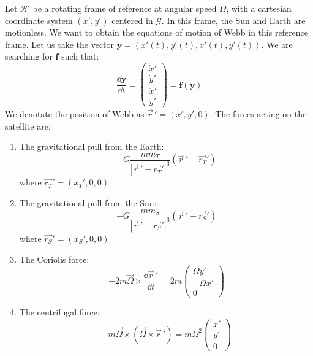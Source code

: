 Let \(\mathcal R'\) be a rotating frame of reference at angular speed \(\Omega\), with a cartesian coordinate system \((x',y')\) centered in \(\mathcal G\). In this frame, the Sun and Earth are motionless. We want to obtain the equations of motion of Webb in this reference frame. Let us take the vector \(\mathbf{y} = (x'(t), y'(t), \dot x'(t), \dot y'(t))\). We are searching for \(\mathbf{f}\) such that:
\begin{equation}
    \frac{\dd \mathbf{y}}{\dd t} = \left(\begin{matrix} \dot x' \\ \dot y' \\ \ddot x' \\ \ddot y' \end{matrix}\right) = \mathbf{f}(\mathbf{y})
\end{equation}
We denotate the position of Webb as \(\vec{r}\,' = (x', y', 0)\). The forces acting on the satellite are:
\begin{enumerate}
    \item The gravitational pull from the Earth:
    \begin{equation}
        -G \frac{m m_T}{|\vec{r}\,' - \vec{r_T}'|^3} (\vec{r}\,' - \vec{r_T}')
    \end{equation}
    where \(\vec{r_T}' = (x_T', 0, 0)\)
    \item The gravitational pull from the Sun:
    \begin{equation}
        -G \frac{m m_S}{|\vec{r}\,' - \vec{r_S}'|^3} (\vec{r}\,' - \vec{r_S}')
    \end{equation}
    where \(\vec{r_S}' = (x_S', 0, 0)\)
    \item The Coriolis force:
    \begin{equation}
        -2 m \vec\Omega \times \frac{\dd \vec{r}\,'}{\dd t} = 2 m \left(\begin{matrix} \Omega \dot y' \\ -\Omega \dot x' \\ 0 \end{matrix}\right)
    \end{equation}
    \item The centrifugal force:
    \begin{equation}
        -m \vec\Omega \times (\vec\Omega \times \vec{r}\,') = m \Omega^2 \left(\begin{matrix} x' \\ y' \\ 0 \end{matrix}\right)
    \end{equation}
\end{enumerate}
